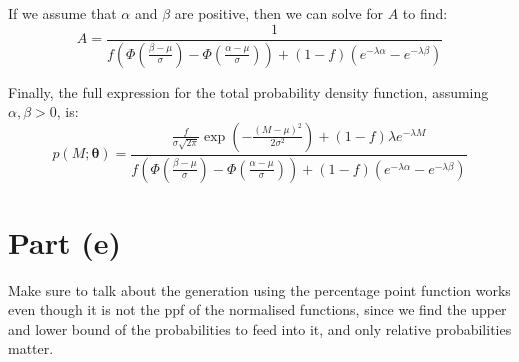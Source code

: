 \documentclass{article}
\begin{document}
If we assume that $\alpha$ and $\beta$ are positive, then we can solve for $A$ to find:
\[
A = \frac{1}{
f \left( \Phi(\frac{\beta-\mu}{\sigma}) - \Phi(\frac{\alpha-\mu}{\sigma}) \right) +
(1-f)( e^{-\lambda\alpha} - e^{-\lambda\beta} )
}
\]

Finally, the full expression for the total probability density function, assuming $\alpha, \beta > 0$, is:
\[
p(M; \boldsymbol{\theta}) = 
\frac{
\frac{f}{\sigma\sqrt{2\pi}} \exp\left(-\frac{(M - \mu)^2}{2\sigma^2}\right) + (1-f)\lambda e^{-\lambda M}
}
{
f \left( \Phi(\frac{\beta-\mu}{\sigma}) - \Phi(\frac{\alpha-\mu}{\sigma}) \right) +
(1-f)( e^{-\lambda\alpha} - e^{-\lambda\beta} )
}
\]

\section*{Part (e)}

Make sure to talk about the generation using the percentage point function works even though it is not the ppf of the normalised functions, since we find the upper and lower bound of the probabilities to feed into it, and only relative probabilities matter. 
\end{document}
